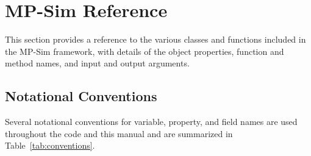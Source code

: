 \documentclass[12pt]{article}
\newcommand{\mpsim}[0]{{MP-Sim}}
\numberwithin{equation}{section}
\numberwithin{table}{section}
\numberwithin{figure}{section}
\begin{document}
\clearpage
\section{\mpsim{} Reference}
\label{sec:mpsim_ref}

This section provides a reference to the various classes and functions included in the \mpsim{} framework, with details of the object properties, function and method names, and input and output arguments.

\subsection{Notational Conventions}

Several notational conventions for variable, property, and field names are used throughout the code and this manual and are summarized in Table~\ref{tab:conventions}.
\end{document}
